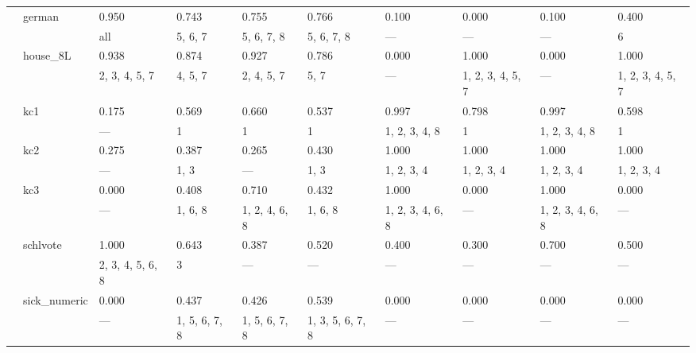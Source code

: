 \documentclass{article}
\begin{document}
\begin{center}
\begin{longtable}{p{1.2cm}p{1.8cm}p{1cm}p{1cm}p{1cm}p{1cm}p{1cm}p{1cm}p{1cm}p{1cm}}
             & german       & 0.950            & 0.743            & 0.755            & 0.766            & 0.100            & 0.000            & 0.100            & 0.400            \\
             &              & all              & 5, 6, 7          & 5, 6, 7, 8       & 5, 6, 7, 8       & ---              & ---              & ---              & 6                \\
             & house\_8L     & 0.938            & 0.874            & 0.927            & 0.786            & 0.000            & 1.000            & 0.000            & 1.000            \\
             &              & 2, 3, 4, 5, 7    & 4, 5, 7          & 2, 4, 5, 7       & 5, 7             & ---              & 1, 2, 3, 4, 5, 7 & ---              & 1, 2, 3, 4, 5, 7 \\
             & kc1          & 0.175            & 0.569            & 0.660            & 0.537            & 0.997            & 0.798            & 0.997            & 0.598            \\
             &              & ---              & 1                & 1                & 1                & 1, 2, 3, 4, 8    & 1                & 1, 2, 3, 4, 8    & 1                \\
             & kc2          & 0.275            & 0.387            & 0.265            & 0.430            & 1.000            & 1.000            & 1.000            & 1.000            \\
             &              & ---              & 1, 3             & ---              & 1, 3             & 1, 2, 3, 4       & 1, 2, 3, 4       & 1, 2, 3, 4       & 1, 2, 3, 4       \\
             & kc3          & 0.000            & 0.408            & 0.710            & 0.432            & 1.000            & 0.000            & 1.000            & 0.000            \\
             &              & ---              & 1, 6, 8          & 1, 2, 4, 6, 8    & 1, 6, 8          & 1, 2, 3, 4, 6, 8 & ---              & 1, 2, 3, 4, 6, 8 & ---              \\
             & schlvote     & 1.000            & 0.643            & 0.387            & 0.520            & 0.400            & 0.300            & 0.700            & 0.500            \\
             &              & 2, 3, 4, 5, 6, 8 & 3                & ---              & ---              & ---              & ---              & ---              & ---              \\
             & sick\_numeric & 0.000            & 0.437            & 0.426            & 0.539            & 0.000            & 0.000            & 0.000            & 0.000            \\
             &              & ---              & 1, 5, 6, 7, 8    & 1, 5, 6, 7, 8    & 1, 3, 5, 6, 7, 8 & ---              & ---              & ---              & ---              \\
\hline
\end{longtable}
\end{center}
\end{document}

